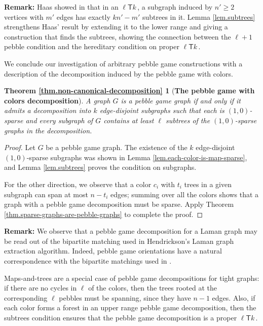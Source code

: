 \documentclass[11pt]{article}
\newcommand{\ellteekay}{\ensuremath{\ell{\mathsf T}k}\,}
\newcommand{\reflem}[1]{Lemma \ref{lem.#1}}
\newcommand{\refthm}[1]{Theorem \ref{thm.#1}}
\newcommand{\restateenv}{ZZZ}
\newenvironment{restate}[1]{
  \renewcommand{\restateenv}{restate.#1}
  \newtheorem*{\restateenv}{\refthm{#1}}
  \begin{\restateenv}
}{\end{\restateenv}}
\begin{document}
{\bf Remark:}  Haas showed in \cite{haas:2002} that in an \ellteekay, a 
subgraph induced by $n'\ge 2$ vertices with $m'$ edges has exactly $kn'-m'$
subtrees in it.  \reflem{subtrees} strengthens Haas' result by extending it 
to the lower range and giving a construction that finds the subtrees, showing 
the connection between the $\ell+1$ pebble condition and the hereditary 
condition on proper \ellteekay. 

We conclude our investigation of arbitrary pebble game constructions 
with a description of the decomposition induced by the pebble game with colors.
	
\begin{restate}{non-canonical-decomposition}[{\bf The pebble game with colors decomposition}] 
		A graph $G$ is a pebble game graph if and only if it admits a decomposition into $k$	
		edge-disjoint subgraphs such that each  is $(1,0)$-sparse and every subgraph of $G$ 
		contains at least $\ell$  subtrees of the $(1,0)$-sparse graphs in the decomposition.
\end{restate}
	
\begin{proof}
Let $G$ be a pebble game graph.  The existence of the $k$ edge-disjoint
$(1,0)$-sparse subgraphs was shown in  \reflem{each-color-is-map-sparse}, and
\reflem{subtrees} proves the condition on subgraphs.

For the other direction, we observe that a color 
$c_i$ with $t_i$ trees in a given subgraph can span at most $n-t_i$
edges; summing over all the colors shows that a graph with a pebble game decomposition
must be sparse.  Apply \refthm{sparse-graphs-are-pebble-graphs} to complete the proof.
\end{proof}
	
{\bf Remark: } We observe that a pebble game decomposition for a 
Laman graph may be 
read out of the bipartite matching used in Hendrickson's Laman graph 
extraction algorithm.  Indeed, pebble game orientations have a natural 
correspondence with the bipartite matchings used in 
\cite{hendrickson-thesis,hendrickson:uniqueRealizability:1992}.

Maps-and-trees are a special case of pebble game decompositions for tight graphs:
if there are no cycles in $\ell$ of the colors, then the trees rooted at the 
corresponding $\ell$ pebbles must be spanning, since they have $n-1$ edges.
Also, if each color forms a forest in an upper range pebble game decomposition, then
the subtrees condition ensures that the pebble game decomposition is a proper
$\ellteekay$.
\end{document}
